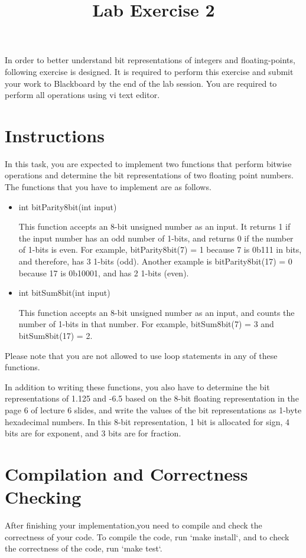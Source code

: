 \documentclass[twoside,11pt]{article}
\newcommand\assignmentNumber{2}
\begin{document}
    \title{Lab Exercise \assignmentNumber}
    \maketitle
In order to better understand bit representations of integers and floating-points, following exercise is designed. It is required to perform this exercise and submit your work to Blackboard by the end of the lab session. You are required to perform all operations using vi text editor.

\section{Instructions}

In this task, you are expected to implement two functions that perform bitwise operations and 
determine the bit representations of two floating point numbers. The functions that you have to 
implement are as follows.

\begin{itemize}
\item int bitParity8bit(int input)

This function accepts an 8-bit unsigned number as an input. It returns 1 if the input number has 
an odd number of 1-bits, and returns 0 if the number of 1-bits is even. For example, 
bitParity8bit(7) = 1 because 7 is 0b111 in bits, and therefore, has 3 1-bits (odd). Another example
is bitParity8bit(17) = 0 because 17 is 0b10001, and has 2 1-bits (even).

\item int bitSum8bit(int input)

This function accepts an 8-bit unsigned number as an input, and counts the number of 1-bits in 
that number. For example, bitSum8bit(7) = 3 and bitSum8bit(17) = 2.

\end{itemize}

Please note that you are not allowed to use loop statements in any of these functions. 

In addition to writing these functions, you also have to determine the bit representations of 
1.125 and -6.5 based on the 8-bit floating representation in the page 6 of lecture 6 slides, 
and write the values of the bit representations as 1-byte hexadecimal numbers. In this 8-bit 
representation, 1 bit is allocated for sign, 4 bits are for exponent, and 3 bits are for fraction.

\section{Compilation and Correctness Checking}

After finishing your implementation,you need to compile and check the correctness of your code. To compile the code, run `make install`, and to check the correctness of the code, run `make test`.

\newpage
\end{document}
